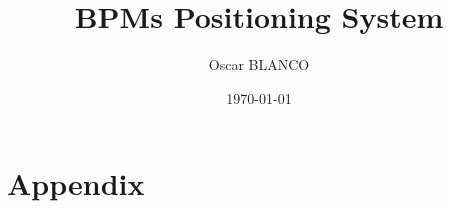 \documentclass[a4paper,11pt]{book}
\title{BPMs Positioning System}
\author{Oscar BLANCO}
\date{\today}
\begin{document}
\maketitle
\tableofcontents
\listoffigures
\listoftables
\frontmatter

\mainmatter




\appendix
\chapter{Appendix}



\backmatter

\end{document}
